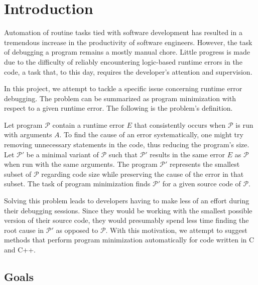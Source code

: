\chapter{Introduction}


Automation of routine tasks tied with software development has resulted in 
a tremendous increase in the productivity of software engineers. 
However, the task of debugging a program remains a mostly manual chore. 
Little progress is made due to the difficulty of reliably encountering 
logic-based runtime errors in the code, a task that, to this day, requires 
the developer's attention and supervision. 

In this project, we attempt to tackle a specific issue concerning runtime 
error debugging. 
The problem can be summarized as program minimization with respect to a given 
runtime error. 
The following is the problem's definition.

Let program $\mathcal{P}$ contain a runtime error $E$ that consistently 
occurs when $\mathcal{P}$ is run with arguments $A$. 
To find the cause of an error systematically, one might try removing 
unnecessary statements in the code, thus reducing the program's size. 
Let $\mathcal{P'}$ be a minimal variant of $\mathcal{P}$ such that 
$\mathcal{P'}$ results in the same error $E$ as $\mathcal{P}$ when run with 
the same arguments. 
The program $\mathcal{P'}$ represents the smallest subset of $\mathcal{P}$ 
regarding code size while preserving the cause of the error in that subset. 
The task of program minimization finds $\mathcal{P'}$ for a given source code 
of $\mathcal{P}$.

Solving this problem leads to developers having to make less of an effort 
during their debugging sessions. 
Since they would be working with the smallest possible version of their 
source code, they would presumably spend less time finding the root cause 
in $\mathcal{P'}$ as opposed to $\mathcal{P}$.  
With this motivation, we attempt to suggest methods that perform program 
minimization automatically for code written in C and C++.

\section{Goals}

